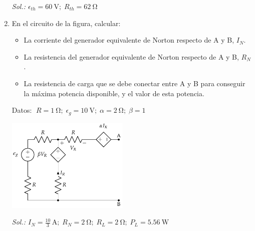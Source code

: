 \begin{enumerate}
    \emph{Sol.:\; $\epsilon_{th}=\qty{60}{\volt};\;R_{th}=\qty{62}{\ohm}$}

  \item En el circuito de la figura, calcular:
    \begin{itemize}
    \item La corriente del generador equivalente de Norton respecto de
      A y B, $I_N$.
    \item La resistencia del generador equivalente de Norton respecto
      de A y B, $R_N$.
    \item La resistencia de carga que se debe conectar entre A y B
      para conseguir la máxima potencia disponible, y el valor de esta
      potencia.
    \end{itemize}
    Datos:
    $\; R = \qty{1}{\ohm};\; \epsilon_g = \qty{10}{\volt};\; \alpha = \qty{2}{\ohm};\; \beta = 1$

    \begin{center}
      \includegraphics[height=4.5cm]{../figs/norton.pdf}
    \end{center}


\emph{Sol.:\;
  $I_N=\frac{10}{3}\,\si{\ampere};\; R_N=\qty{2}{\ohm};\; R_L=\qty{2}{\ohm};\;
  P_L=\qty{5.56}{\watt}$}

\end{enumerate}

